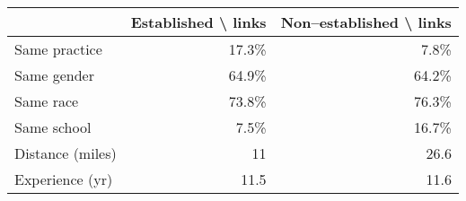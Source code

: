 \begin{tabular}{lrr}
& Established \textbackslash{} links & Non--established \textbackslash{} links\\
\hline\hline
Same practice & 17.3\% & 7.8\%\\
Same gender & 64.9\% & 64.2\%\\
Same race & 73.8\% & 76.3\%\\
Same school & 7.5\% & 16.7\%\\
Distance (miles) & 11 & 26.6\\
Experience (yr) & 11.5 & 11.6\\
\end{tabular}
